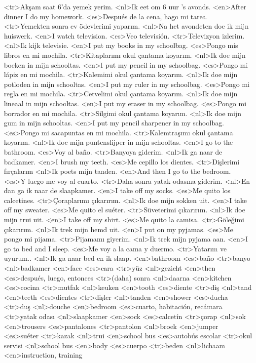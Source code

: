 <tr>Akşam saat 6’da yemek yerim.
<nl>Ik eet om 6 uur 's avonds.
<en>After dinner I do my homework.
<es>Después de la cena, hago mi tarea.
<tr>Yemekten sonra ev ödevlerimi yaparım.
<nl>Na het avondeten doe ik mijn huiswerk.
<en>I watch television.
<es>Veo televisión.
<tr>Televizyon izlerim.
<nl>Ik kijk televisie.
<en>I put my books in my schoolbag.
<es>Pongo mis libros en mi mochila.
<tr>Kitaplarımı okul çantama koyarım.
<nl>Ik doe mijn boeken in mijn schooltas.
<en>I put my pencil in my schoolbag.
<es>Pongo mi lápiz en mi mochila.
<tr>Kalemimi okul çantama koyarım.
<nl>Ik doe mijn potloden in mijn schooltas.
<en>I put my ruler in my schoolbag.
<es>Pongo mi regla en mi mochila.
<tr>Cetvelimi okul çantama koyarım.
<nl>Ik doe mijn lineaal in mijn schooltas.
<en>I put my eraser in my schoolbag.
<es>Pongo mi borrador en mi mochila.
<tr>Silgimi okul çantama koyarım.
<nl>Ik doe mijn gum in mijn schooltas.
<en>I put my pencil sharpener in my schoolbag.
<es>Pongo mi sacapuntas en mi mochila.
<tr>Kalemtraşımı okul çantama koyarım.
<nl>Ik doe mijn puntenslijper in mijn schooltas.
<en>I go to the bathroom.
<es>Voy al baño.
<tr>Banyoya giderim.
<nl>Ik ga naar de badkamer.
<en>I brush my teeth.
<es>Me cepillo los dientes.
<tr>Dişlerimi fırçalarım
<nl>Ik poets mijn tanden.
<en>And then I go to the bedroom.
<es>Y luego me voy al cuarto.
<tr>Daha sonra yatak odasına giderim.
<nl>En dan ga ik naar de slaapkamer.
<en>I take off my socks.
<es>Me quito los calcetines.
<tr>Çoraplarımı çıkarırım.
<nl>Ik doe mijn sokken uit.
<en>I take off my sweater.
<es>Me quito el suéter.
<tr>Süveterimi çıkarırım.
<nl>Ik doe mijn trui uit.
<en>I take off my shirt.
<es>Me quito la camisa.
<tr>Göleğimi çıkarırım.
<nl>Ik trek mijn hemd uit.
<en>I put on my pyjamas.
<es>Me pongo mi pijama.
<tr>Pijamamı giyerim.
<nl>Ik trek mijn pyjama aan.
<en>I go to bed and I sleep.
<es>Me voy a la cama y duermo.
<tr>Yatarım ve uyurum..
<nl>Ik ga naar bed en ik slaap.
<en>bathroom
<es>baño
<tr>banyo
<nl>badkamer
<en>face
<es>cara
<tr>yüz
<nl>gezicht
<en>then
<es>después, luego, entonces
<tr>(daha) sonra
<nl>daarna
<en>kitchen
<es>cocina
<tr>mutfak
<nl>keuken
<en>tooth
<es>diente
<tr>diş
<nl>tand
<en>teeth
<es>dientes
<tr>dişler
<nl>tanden
<en>shower
<es>ducha
<tr>duş
<nl>douche
<en>bedroom
<es>cuarto, habitación, recámara
<tr>yatak odası
<nl>slaapkamer
<en>sock
<es>calcetín
<tr>çorap
<nl>sok
<en>trousers
<es>pantalones
<tr>pantolon
<nl>broek
<en>jumper
<es>suéter
<tr>kazak
<nl>trui
<en>school bus
<es>autobús escolar
<tr>okul servisi
<nl>school bus
<en>body
<es>cuerpo
<tr>beden
<nl>lichaam
<en>instruction, training
